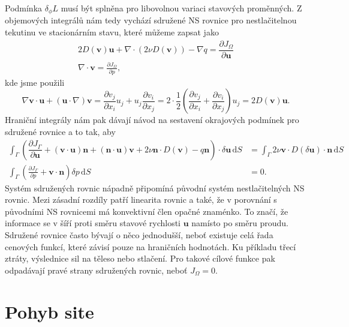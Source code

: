 Podmínka $ \delta_\phi L $ musí být splněna pro libovolnou variaci stavových proměnných. Z objemových integrálů nám tedy vychází sdružené NS rovnice pro nestlačitelnou tekutinu ve stacionárním stavu, které můžeme zapsat jako
\begin{align}
2D(\mathbf{v})\mathbf{u}
+ \nabla \cdot \left( 2\nu D(\mathbf{v}) \right)
- \nabla q 
=
\dfrac{\partial J_{\Omega}}{\partial \mathbf{u}} 
\\
\nabla \cdot \mathbf{v} 
= 
\frac{\partial J_\Omega}{\partial p},
\end{align}
kde jsme použili  
\begin{equation*}
\nabla \mathbf{v}\cdot \mathbf{u}
+ (\mathbf{u} \cdot \nabla)\mathbf{v} 
=
\frac{\partial v_j}{\partial x_i}  u_j + u_j  \frac{\partial v_i}{\partial x_j} 
=
2\cdot\frac{1}{2}
\left(
\frac{\partial v_j}{\partial x_i}
+ \frac{\partial v_i}{\partial x_j} 
\right)
u_j
=
2D(\mathbf{v})\mathbf{u}.
\end{equation*}
Hraniční integrály nám pak dávají návod na sestavení okrajových podmínek pro sdružené rovnice a to tak, aby
\begin{align}
\label{eq:sdruzenaOP1}
\int_{\Gamma}
\left(
\dfrac{\partial J_{\Gamma}}{\partial \mathbf{u}}
+ (\mathbf{v}\cdot \mathbf{u} )\mathbf{n} 
+ (\mathbf{n} \cdot \mathbf{u}) \mathbf{v}
+ 2\nu \mathbf{n} \cdot  D(\mathbf{v})
- q \mathbf{n}
\right)
\cdot \delta \mathbf{u}
\, \mathrm{d}S
&= 
\int_{\Gamma} 
2\nu \mathbf{v} \cdot  D(\delta \mathbf{u})\cdot \mathbf{n}
\, \mathrm{d}S
\\
\label{eq:sdruzenaOP2}
\int_{\Gamma}
\left(
\frac{\partial J_\Gamma}{\partial p}
+ \mathbf{v} \cdot \mathbf{n}
\right)
\delta p
\, \mathrm{d}S
&= 0.
\end{align}
Systém sdružených rovnic nápadně připomíná původní systém nestlačitelných NS rovnic. Mezi zásadní rozdíly patří linearita rovnic a také, že v porovnání s původními NS rovnicemi má konvektivní člen opačné znaménko. To značí, že informace se v šíří proti směru stavové rychlosti $ \mathbf{u} $ namísto po směru proudu. Sdružené rovnice často bývají o něco jednodušší, neboť existuje celá řada cenových funkcí, které závisí pouze na hraničních hodnotách. Ku příkladu třecí ztráty, výslednice sil na těleso nebo stlačení. Pro takové cílové funkce pak odpadávají pravé strany sdružených rovnic, neboť $ J_\Omega = 0 $.


\section{Pohyb site}

